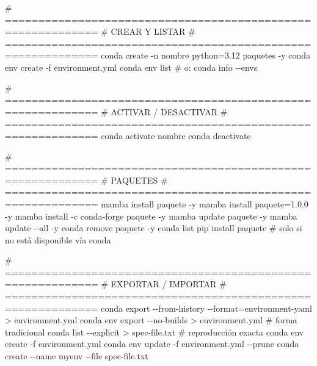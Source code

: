 \documentclass[
  doc,
  floatsintext,
  longtable,
  a4paper,
  nolmodern,
  notxfonts,
  notimes,
  12pt,
  colorlinks=true,linkcolor=blue,citecolor=blue,urlcolor=blue]{apa7}
\newenvironment{Shaded}{\begin{snugshade}}{\end{snugshade}}
\newcommand{\AttributeTok}[1]{\textcolor[rgb]{0.40,0.45,0.13}{#1}}
\newcommand{\CommentTok}[1]{\textcolor[rgb]{0.37,0.37,0.37}{#1}}
\newcommand{\ExtensionTok}[1]{\textcolor[rgb]{0.00,0.23,0.31}{#1}}
\newcommand{\NormalTok}[1]{\textcolor[rgb]{0.00,0.23,0.31}{#1}}
\newcommand{\OperatorTok}[1]{\textcolor[rgb]{0.37,0.37,0.37}{#1}}
\begin{document}
\begin{Shaded}
\begin{Highlighting}[]
\CommentTok{\# ============================================================}
\CommentTok{\# CREAR Y LISTAR}
\CommentTok{\# ============================================================}
\ExtensionTok{conda}\NormalTok{ create }\AttributeTok{{-}n}\NormalTok{ nombre python=3.12 paquetes }\AttributeTok{{-}y}
\ExtensionTok{conda}\NormalTok{ env create }\AttributeTok{{-}f}\NormalTok{ environment.yml}
\ExtensionTok{conda}\NormalTok{ env list                       }\CommentTok{\# o: conda info {-}{-}envs}

\CommentTok{\# ============================================================}
\CommentTok{\# ACTIVAR / DESACTIVAR}
\CommentTok{\# ============================================================}
\ExtensionTok{conda}\NormalTok{ activate nombre}
\ExtensionTok{conda}\NormalTok{ deactivate}

\CommentTok{\# ============================================================}
\CommentTok{\# PAQUETES}
\CommentTok{\# ============================================================}
\ExtensionTok{mamba}\NormalTok{ install paquete }\AttributeTok{{-}y}
\ExtensionTok{mamba}\NormalTok{ install paquete=1.0.0 }\AttributeTok{{-}y}
\ExtensionTok{mamba}\NormalTok{ install }\AttributeTok{{-}c}\NormalTok{ conda{-}forge paquete }\AttributeTok{{-}y}
\ExtensionTok{mamba}\NormalTok{ update paquete }\AttributeTok{{-}y}
\ExtensionTok{mamba}\NormalTok{ update }\AttributeTok{{-}{-}all} \AttributeTok{{-}y}
\ExtensionTok{conda}\NormalTok{ remove paquete }\AttributeTok{{-}y}
\ExtensionTok{conda}\NormalTok{ list}
\ExtensionTok{pip}\NormalTok{ install paquete   }\CommentTok{\# solo si no está disponible vía conda}

\CommentTok{\# ============================================================}
\CommentTok{\# EXPORTAR / IMPORTAR}
\CommentTok{\# ============================================================}
\ExtensionTok{conda}\NormalTok{ export }\AttributeTok{{-}{-}from{-}history} \AttributeTok{{-}{-}format}\OperatorTok{=}\NormalTok{environment{-}yaml }\OperatorTok{\textgreater{}}\NormalTok{ environment.yml}
\ExtensionTok{conda}\NormalTok{ env export }\AttributeTok{{-}{-}no{-}builds} \OperatorTok{\textgreater{}}\NormalTok{ environment.yml          }\CommentTok{\# forma tradicional}
\ExtensionTok{conda}\NormalTok{ list }\AttributeTok{{-}{-}explicit} \OperatorTok{\textgreater{}}\NormalTok{ spec{-}file.txt                   }\CommentTok{\# reproducción exacta}
\ExtensionTok{conda}\NormalTok{ env create }\AttributeTok{{-}f}\NormalTok{ environment.yml}
\ExtensionTok{conda}\NormalTok{ env update }\AttributeTok{{-}f}\NormalTok{ environment.yml }\AttributeTok{{-}{-}prune}
\ExtensionTok{conda}\NormalTok{ create }\AttributeTok{{-}{-}name}\NormalTok{ myenv }\AttributeTok{{-}{-}file}\NormalTok{ spec{-}file.txt}


\end{Highlighting}
\end{Shaded}
\end{document}

